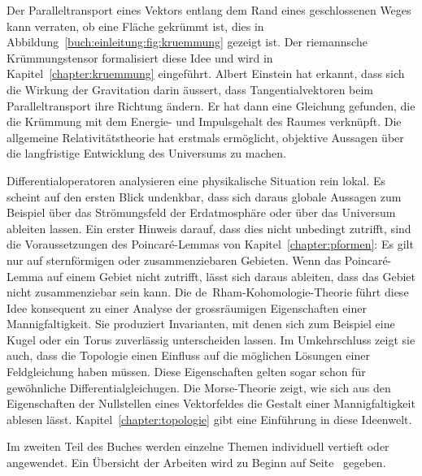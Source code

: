 Der Paralleltransport eines Vektors entlang dem Rand eines
geschlossenen Weges kann verraten, ob eine Fläche gekrümmt ist, 
dies in Abbildung~\ref{buch:einleitung:fig:kruemmung} gezeigt ist.
%
Der riemannsche Krümmungstensor formalisiert diese Idee und wird
%
in Kapitel~\ref{chapter:kruemmung} eingeführt.
Albert Einstein hat erkannt, dass sich die Wirkung der Gravitation
%
darin äussert, dass Tangentialvektoren beim Paralleltransport 
ihre Richtung ändern.
Er hat dann eine Gleichung gefunden, die die Krümmung mit dem
Energie- und Impulsgehalt des Raumes verknüpft.
Die allgemeine Relativitätstheorie hat erstmals ermöglicht,
%
%
objektive Aussagen über die langfristige Entwicklung des
Universums zu machen.

Differentialoperatoren analysieren eine physikalische Situation
rein lokal.
Es scheint auf den ersten Blick undenkbar, dass sich daraus globale
Aussagen zum Beispiel über das Strömungsfeld der Erdatmosphäre oder
über das Universum ableiten lassen.
Ein erster Hinweis darauf, dass dies nicht unbedingt zutrifft, sind
die Voraussetzungen des Poincaré-Lemmas von Kapitel~\ref{chapter:pformen}:
%
Es gilt nur auf sternförmigen oder zusammenziebaren Gebieten.
Wenn das Poincaré-Lemma auf einem Gebiet nicht zutrifft, lässt sich
daraus ableiten, dass das Gebiet nicht zusammenziebar sein kann.
Die de~Rham-Kohomologie-Theorie führt diese Idee konsequent zu einer
%
Analyse der grossräumigen Eigenschaften einer Mannigfaltigkeit.
Sie produziert Invarianten, mit denen sich zum Beispiel eine Kugel
oder ein Torus zuverlässig unterscheiden lassen.
Im Umkehrschluss zeigt sie auch, dass die Topologie einen Einfluss
%
auf die möglichen Lösungen einer Feldgleichung haben müssen.
Diese Eigenschaften gelten sogar schon für gewöhnliche
Differentialgleichugen.
Die Morse-Theorie zeigt, wie sich aus den Eigenschaften der Nullstellen
%
eines Vektorfeldes die Gestalt einer Mannigfaltigkeit ablesen lässt.
Kapitel~\ref{chapter:topologie} gibt eine Einführung in diese 
Ideenwelt.

Im zweiten Teil des Buches werden einzelne Themen individuell
vertieft oder angewendet.
Ein Übersicht der Arbeiten wird zu Beginn auf Seite~\pageref{buch:uebersicht}
gegeben.

